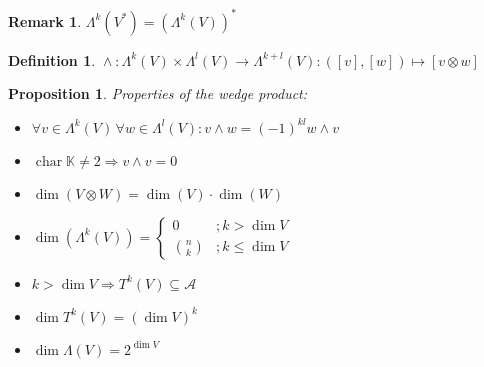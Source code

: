 \documentclass{scrartcl}
\newtheorem*{mydef}{Definition}
\newtheorem*{prop}{Proposition}
\newtheorem*{remark}{Remark}
\begin{document}
\begin{remark}
  $\Lambda^k(V^*) = \left(\Lambda^k(V)\right)^*$
\end{remark}

\begin{mydef}
  ${}\wedge{} : \Lambda^k(V) \times \Lambda^l(V) \rightarrow \Lambda^{k+l}(V): ([v],[w]) \mapsto [v\otimes w]$
\end{mydef}

\begin{prop}
  Properties of the wedge product:

  \begin{itemize}
  \item $\forall v\in \Lambda^k(V)\,\forall w\in \Lambda^l(V): v \wedge w = (-1)^{kl} w \wedge v$
  \item $\operatorname{char} \mathbb K \ne 2 \Rightarrow v \wedge v = 0$
  \item $\operatorname{dim}(V\otimes W)=\operatorname{dim}(V) \cdot \operatorname{dim}(W)$
  \item $\operatorname{dim}\left(\Lambda^k(V)\right) = \left\{ \begin{matrix} 0 & ; k > \operatorname{dim} V \\ \binom nk & ; k \le \operatorname{dim} V \end{matrix} \right.$
  \item $k > \operatorname{dim} V \Rightarrow T^k(V) \subseteq \mathcal A$
  \item $\operatorname{dim} T^k(V) = (\operatorname{dim} V)^k$
  \item $\operatorname{dim} \Lambda(V) = 2^{\operatorname{dim} V}$
  \end{itemize}
\end{prop}
\end{document}
